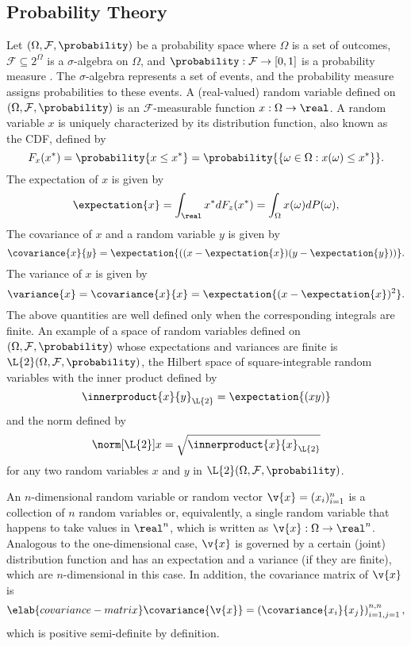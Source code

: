 \subsection{Probability Theory}

Let $(\Omega, \mathcal{F}, \probability)$ be a probability space where $\Omega$
is a set of outcomes, $\mathcal{F} \subseteq 2^\Omega$ is a $\sigma$-algebra on
$\Omega$, and $\probability: \mathcal{F} \to [0, 1]$ is a probability measure
\cite{durrett2010}. The $\sigma$-algebra represents a set of events, and the
probability measure assigns probabilities to these events. A (real-valued)
random variable defined on $(\Omega, \mathcal{F}, \probability)$ is an
$\mathcal{F}$-measurable function $x: \Omega \to \real$. A random variable $x$
is uniquely characterized by its distribution function, also known as the
\ac{CDF}, defined by
\begin{equation*}
  F_x(x^*) = \probability{x \leq x^*} = \probability{\{ \omega \in \Omega: x(\omega) \leq x^* \}}.
\end{equation*}
The expectation of $x$ is given by
\[
  \expectation{x} = \int_\real x^* dF_z(x^*) = \int_\Omega x(\omega) dP(\omega),
\]
The covariance of $x$ and a random variable $y$ is given by
\[
  \covariance{x}{y} = \expectation{((x - \expectation{x})(y - \expectation{y}))}.
\]
The variance of $x$ is given by
\[
  \variance{x} = \covariance{x}{x} = \expectation{(x - \expectation{x})^2}.
\]
The above quantities are well defined only when the corresponding integrals are
finite. An example of a space of random variables defined on $(\Omega,
\mathcal{F}, \probability)$ whose expectations and variances are finite is
$\L{2}(\Omega, \mathcal{F}, \probability)$, the Hilbert space of
square-integrable random variables \cite{janson1997} with the inner product
defined by
\[
  \innerproduct{x}{y}_\L{2} = \expectation{(x y)}
\]
and the norm defined by
\[
  \norm[\L{2}]{x} = \sqrt{\innerproduct{x}{x}_\L{2}}
\]
for any two random variables $x$ and $y$ in $\L{2}(\Omega, \mathcal{F},
\probability)$.

An $n$-dimensional random variable or random vector $\v{x} = (x_i)_{i = 1}^n$ is
a collection of $n$ random variables or, equivalently, a single random variable
that happens to take values in $\real^n$, which is written as $\v{x}: \Omega \to
\real^n$. Analogous to the one-dimensional case, $\v{x}$ is governed by a
certain (joint) distribution function and has an expectation and a variance (if
they are finite), which are $n$-dimensional in this case. In addition, the
covariance matrix of $\v{x}$ is
\begin{equation} \elab{covariance-matrix}
  \covariance{\v{x}} = \left(\covariance{x_i}{x_j}\right)_{i = 1, j = 1}^{n, n},
\end{equation}
which is positive semi-definite by definition.

